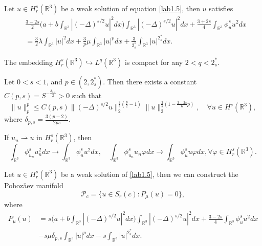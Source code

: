 \begin{proposition}\label{pro2.2}
Let $u\in H^s_r(\mathbb{R}^3)$ be a weak solution of equation  \eqref{lab1.5},
then $u$ satisfies
\begin{align*}
&\frac{3-2s}{2}\Big(a+b\int_{\mathbb{R}^3}|(-\Delta)^{s/2}u|^2dx\Big)
 \int_{\mathbb{R}^3}|(-\Delta)^{s/2}u|^2dx
 +\frac{3+2s}{4}\int_{\mathbb{R}^3}\phi^s_u u^2dx\\
&=\frac{3}{2}\lambda \int_{\mathbb{R}^3}|u|^2dx
 +\frac{3}{p}\mu \int_{\mathbb{R}^3}|u|^pdx
 +\frac{3}{2^*_s}\int_{\mathbb{R}^3}|u|^{2^*_s}dx.
\end{align*}
\end{proposition}

\begin{lemma}[\cite{D1688}] \label{lem2.1311}
The embedding $H^s_r(\mathbb{R}^3)\hookrightarrow L^q(\mathbb{R}^3)$ is compact for
 any $2< q < 2^*_s$.
\end{lemma}

\begin{lemma} \label{lem3.2}
Let $0<s<1$, and $p\in(2, 2^*_s)$. Then there exists a constant
$C(p,s)=S^{-\frac{\delta_{p,s}}{2}}>0$ such that
\begin{equation}\label{3.2}
\|u\|^p_p\leq C(p,s)\|(-\Delta)^{s/2}u\|^{\frac{3}{s}(\frac{p}{2}-1)}_2
\|u\|^{\frac{3}{s}(1-\frac{3-2s}{6}p)}_2, \quad \forall u\in H^s(\mathbb{R}^3),
\end{equation}
where $\delta_{p,s}=\frac{3(p-2)}{2ps}$.
\end{lemma}

\begin{lemma}[\cite{D1678}] \label{lem2.171}
If $u_n\rightharpoonup u$ in $H^s_r(\mathbb{R}^3)$, then
\[
\int_{\mathbb{R}^3}\phi^s_{u_n}u^2_ndx\to \int_{\mathbb{R}^3}\phi^s_{u}u^2dx,\quad
\int_{\mathbb{R}^3}\phi^s_{u_n}u_n\varphi dx\to \int_{\mathbb{R}^3}\phi^s_{u}u\varphi dx, \forall \varphi\in H^s_r(\mathbb{R}^3).
\]
\end{lemma}

\begin{lemma}\label{lem3.5}
Let $u\in H^s_r(\mathbb{R}^3)$ be a weak solution of  \eqref{lab1.5},
then we can construct the Pohoz\v{a}ev manifold
$$
\mathcal{P}_c= \{u\in S_r(c) : P_\mu(u)=0 \},
$$
where
\begin{align*}
P_\mu(u)
&=s\Big(a+b\int_{\mathbb{R}^3}|(-\Delta)^{s/2}u|^2dx\Big)
 \int_{\mathbb{R}^3}|(-\Delta)^{s/2}u|^2dx
  +\frac{3-2s}{4}\int_{\mathbb{R}^3}\phi^s_u u^2dx\\
&-s\mu \delta_{p,s}\int_{\mathbb{R}^3}|u|^pdx-s\int_{\mathbb{R}^3}|u|^{2^*_s}dx.
\end{align*}
\end{lemma}

